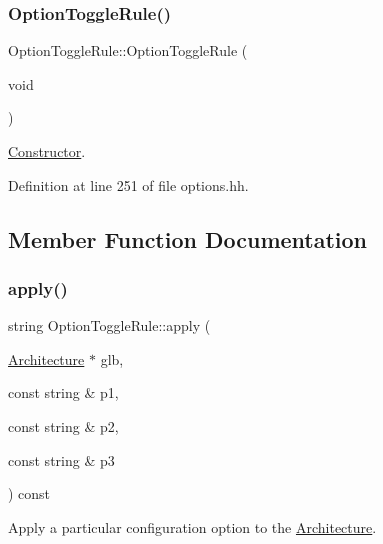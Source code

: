 \subsubsection{\texorpdfstring{OptionToggleRule()}{OptionToggleRule()}}
{\footnotesize\ttfamily Option\+Toggle\+Rule\+::\+Option\+Toggle\+Rule (\begin{DoxyParamCaption}\item[{void}]{ }\end{DoxyParamCaption})\hspace{0.3cm}{\ttfamily [inline]}}



\mbox{\hyperlink{class_constructor}{Constructor}}. 



Definition at line 251 of file options.\+hh.



\subsection{Member Function Documentation}
\mbox{\label{class_option_toggle_rule_aa32ec58eafbd9711221d06fdc4c29b2b}} 
\subsubsection{\texorpdfstring{apply()}{apply()}}
{\footnotesize\ttfamily string Option\+Toggle\+Rule\+::apply (\begin{DoxyParamCaption}\item[{\mbox{\hyperlink{class_architecture}{Architecture}} $\ast$}]{glb,  }\item[{const string \&}]{p1,  }\item[{const string \&}]{p2,  }\item[{const string \&}]{p3 }\end{DoxyParamCaption}) const\hspace{0.3cm}{\ttfamily [virtual]}}



Apply a particular configuration option to the \mbox{\hyperlink{class_architecture}{Architecture}}. 

